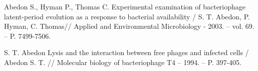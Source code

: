 
\begin{thebibliography}{00}

	
        Abedon S., Hyman P., Thomas C.
        Experimental examination of bacteriophage latent-period evolution
        as a response to bacterial availability /
        S. T. Abedon, P. Hyman, C. Thomas//
        Applied and Environmental Microbiology - 2003. -- vol. 69. -- P. 7499-7506.
        
		S. T. Abedon
		Lysis and the interaction between free phages and infected cells /
		Abedon S. T. //
		Molecular biology of bacteriophage T4 -- 1994. -- P. 397-405.
		
\end{thebibliography}
